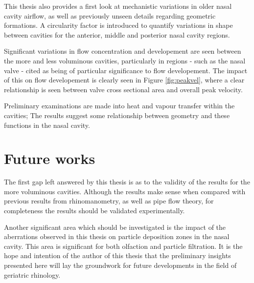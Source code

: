This thesis also provides a first look at mechanistic variations in older nasal cavity airflow, as well as previously unseen details regarding geometric formations. A circularity factor is introduced to quantify variations in shape between cavities for the anterior, middle and posterior nasal cavity regions.

Significant variations in flow concentration and developement are seen between the more and less voluminous cavities, particularly in regions - such as the nasal valve - cited as being of particular significance to flow developement. The impact of this on flow developement is clearly seen in Figure \ref{fig:peakvel}, where a clear relationship is seen between valve cross sectional area and overall peak velocity.

Preliminary examinations are made into heat and vapour transfer within the cavities; The results suggest some relationship between geometry and these functions in the nasal cavity.

\section{Future works}
The first gap left answered by this thesis is as to the validity of the results for the more voluminous cavities.
Although the results make sense when compared with previous results from rhinomanometry, as well as pipe flow theory, for completeness the results should be validated experimentally.

Another significant area which should be investigated is the impact of the aberrations observed in this thesis on particle deposition zones in the nasal cavity.
This area is significant for both olfaction and particle filtration.
It is the hope and intention of the author of this thesis that the preliminary insights presented here will lay the groundwork for future developments in the field of geriatric rhinology.

